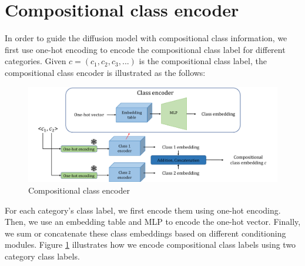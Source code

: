 \section{Compositional class encoder}
In order to guide the diffusion model with compositional class information, we first use one-hot encoding to encode the compositional class label for different categories. Given $c = (c_1, c_2, c_3, ...)$ is the compositional class label, the compositional class encoder is illustrated as the follows:
\begin{figure} [H]
    \centering
    \includegraphics[width=1\linewidth]{figures/Class encoder.pdf}
    \caption{Compositional class encoder}
    \label{fig:class encoder}
\end{figure}

For each category's class label, we first encode them using one-hot encoding. Then, we use an embedding table and MLP to encode the one-hot vector. Finally, we sum or concatenate these class embeddings based on different conditioning modules. Figure \ref{fig:class encoder} illustrates how we encode compositional class labels using two category class labels.

